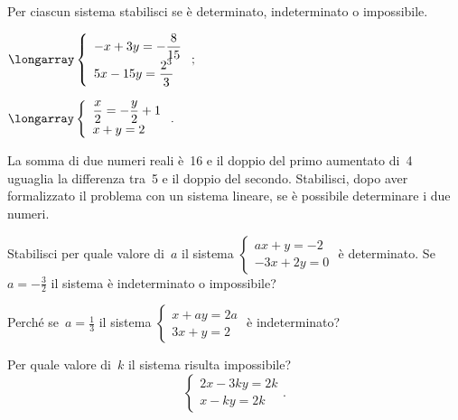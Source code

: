 \begin{esercizio}
 \label{ese:19.35}
Per ciascun sistema stabilisci se è determinato, indeterminato o impossibile.
\begin{multicols}{2}
\begin{enumeratea}
\item $\longarray\left\{\begin{array}{l}-x+3y=-{\dfrac{8}{15}}\\5x-15y=\dfrac{2^{3}}{3}\end{array}\right.;$
\item $\longarray\left\{\begin{array}{l}\dfrac{x}{2}=-{\dfrac{y}{2}}+1\\x+y=2\end{array}\right..$
\end{enumeratea}
\end{multicols}
\end{esercizio}

\begin{esercizio}
 \label{ese:19.36}
La somma di due numeri reali è~16 e il doppio del
primo aumentato di~4 uguaglia la differenza tra~5 e il doppio del
secondo. Stabilisci, dopo aver formalizzato il problema con un sistema
lineare, se è possibile determinare i due numeri.
\end{esercizio}

\begin{esercizio}
 \label{ese:19.37}
Stabilisci per quale valore di~$a$ il sistema
$\left\{\begin{array}{l}ax+y=-2\\-3x+2y=0\end{array}\right.$ è
determinato. Se~$a=-{\frac{3}{2}}$ il sistema è indeterminato o
impossibile?
\end{esercizio}

\begin{esercizio}
 \label{ese:19.38}
Perché se~$a=\frac{1}{3}$ il sistema
$\left\{\begin{array}{l}x+ay=2a\\3x+y=2\end{array}\right.$ è
indeterminato?
\end{esercizio}

\begin{esercizio}
 \label{ese:19.39}
Per quale valore di~$k$ il sistema risulta impossibile?
\[\left\{\begin{array}{l}2x-3ky=2k\\x-ky=2k \end{array}\right.. \]
\end{esercizio}


